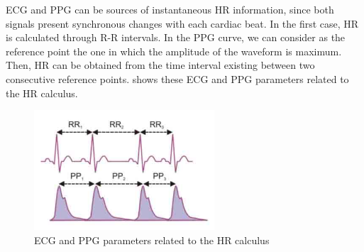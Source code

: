 ECG and PPG can be sources of instantaneous HR information, since both signals present synchronous changes with each cardiac beat. In the first case, HR is calculated through R-R intervals. In the PPG curve, we can consider as the reference point the one in which the amplitude of the waveform is maximum. Then, HR can be obtained from the time interval existing between two consecutive reference points.  shows these ECG and PPG parameters related to the HR calculus. 


\begin{figure}[!ht]
\centering
\includegraphics[width=0.6\textwidth]{images/PPGandECG.jpg}
\caption{ECG and PPG parameters related to the HR calculus}
\label{fig:HRcalculus}
\end{figure}






